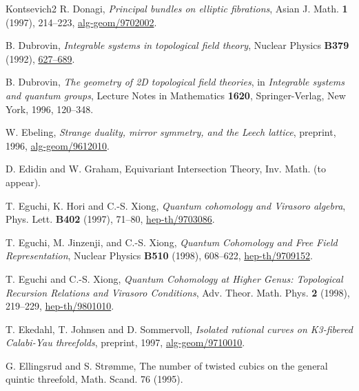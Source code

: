 \begin{thebibliography}{Kontsevich2}
\hypertarget{bib:Donagi}{} R. Donagi, \emph{Principal bundles on elliptic fibrations}, Asian J. Math. \textbf{1} (1997), 214--223, \href{https://arxiv.org/abs/alg-geom/9702002}{alg-geom/9702002}.

\hypertarget{bib:Dubrovin1}{} B. Dubrovin, \emph{Integrable systems in topological field theory}, Nuclear Physics \textbf{B379} (1992), \href{https://people.sissa.it/~dubrovin/Papers/1992/dubrovin_1992_npb.pdf}{627--689}.

\hypertarget{bib:Dubrovin2}{} B. Dubrovin, \emph{The geometry of 2D topological field theories}, in \emph{Integrable systems and quantum groups}, Lecture Notes in Mathematics \textbf{1620}, Springer-Verlag, New York, 1996, 120--348.

\hypertarget{bib:Ebeling}{} W. Ebeling, \emph{Strange duality, mirror symmetry, and the Leech lattice}, preprint, 1996, \href{https://arxiv.org/abs/alg-geom/9612010}{alg-geom/9612010}.

\hypertarget{bib:EG}{}
D. Edidin and W. Graham, Equivariant Intersection Theory, Inv. Math. (to appear).

\hypertarget{bib:EHX}{} T. Eguchi, K. Hori and C.-S. Xiong, \emph{Quantum cohomology and Virasoro algebra}, Phys. Lett. \textbf{B402} (1997), 71--80, \href{https://arxiv.org/abs/hep-th/9703086}{hep-th/9703086}.

\hypertarget{bib:EJX}{}
T. Eguchi, M. Jinzenji, and C.-S. Xiong, \emph{Quantum Cohomology and Free Field Representation}, Nuclear Physics \textbf{B510} (1998), 608--622, \href{https://arxiv.org/abs/hep-th/9709152}{hep-th/9709152}.

\hypertarget{bib:EX}{}
T. Eguchi and C.-S. Xiong, \emph{Quantum Cohomology at Higher Genus: Topological Recursion Relations and Virasoro Conditions}, Adv. Theor. Math. Phys. \textbf{2} (1998), 219--229, \href{https://arxiv.org/abs/hep-th/9801010}{hep-th/9801010}.

\hypertarget{bib:EJS}{} T. Ekedahl, T. Johnsen and D. Sommervoll, \emph{Isolated rational curves on K3-fibered Calabi-Yau threefolds}, preprint, 1997, \href{https://arxiv.org/abs/alg-geom/9710010}{alg-geom/9710010}.

\hypertarget{bib:ES1}{}
G. Ellingsrud and S. Strømme,
The number of twisted cubics on the general quintic threefold,
Math. Scand. 76 (1995).


\end{thebibliography}
